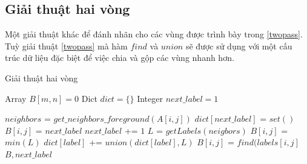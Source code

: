 \subsection{Giải thuật hai vòng}
Một giải thuật khác để đánh nhãn cho các vùng được trình bày trong \ref{twopass}. Tuỳ giải thuật \ref{twopass} mà hàm $find$ và $union$ sẽ được sử dụng với một cấu trúc dữ liệu đặc biệt để việc chia và gộp các vùng nhanh hơn.
\begin{algorithm}
  \caption{Giải thuật hai vòng}\label{twopass}
  \begin{algorithmic}[1]
    \State Array $B[m, n] = 0$ 
    \State Dict $dict = \{\}$
    \State Integer $next\_label = 1$
    
                \State $neighbors$ = $get\_neighbors\_foreground(A[i,j])$
                    \State $dict[next\_label]$ = $set()$
                    \State $B[i,j]$ = $next\_label$
                    \State $next\_label$ += $1$
                \Else
                    \State $L$ = $getLabels(neigbors)$
                    \State $B[i,j]$ = $min(L)$
                        \State $dict[label]$ += $union(dict[label], L)$
                    \EndFor
                \EndIf
            \EndIf
        \EndFor   
    \EndFor
                \State $B[i,j]$ = $find(labels[i,j]$
            \EndIf
        \EndFor   
    \EndFor
    \State \Return $B, next\_label$
    \EndProcedure
  \end{algorithmic}
\end{algorithm}
